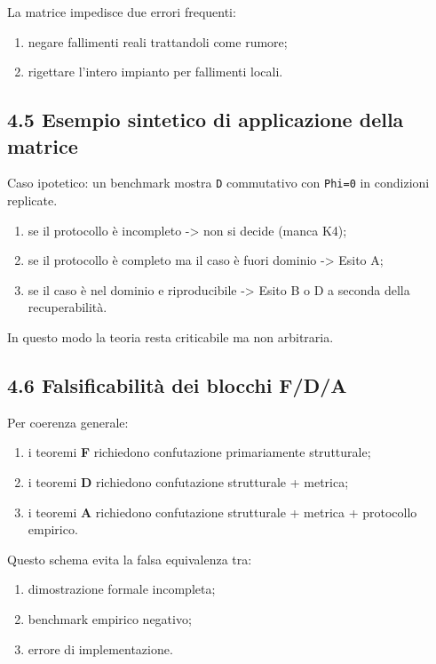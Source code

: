 La matrice impedisce due errori frequenti:

\begin{enumerate}
\def\labelenumi{\arabic{enumi}.}
\tightlist
\item
  negare fallimenti reali trattandoli come rumore;
\item
  rigettare l'intero impianto per fallimenti locali.
\end{enumerate}

\subsection{4.5 Esempio sintetico di applicazione della matrice}

Caso ipotetico: un benchmark mostra \texttt{D} commutativo con \texttt{Phi=0} in condizioni replicate.

\begin{enumerate}
\def\labelenumi{\arabic{enumi}.}
\tightlist
\item
  se il protocollo è incompleto -\textgreater{} non si decide (manca K4);
\item
  se il protocollo è completo ma il caso è fuori dominio -\textgreater{} Esito A;
\item
  se il caso è nel dominio e riproducibile -\textgreater{} Esito B o D a seconda della recuperabilità.
\end{enumerate}

In questo modo la teoria resta criticabile ma non arbitraria.

\subsection{4.6 Falsificabilità dei blocchi F/D/A}

Per coerenza generale:

\begin{enumerate}
\def\labelenumi{\arabic{enumi}.}
\tightlist
\item
  i teoremi \textbf{F} richiedono confutazione primariamente strutturale;
\item
  i teoremi \textbf{D} richiedono confutazione strutturale + metrica;
\item
  i teoremi \textbf{A} richiedono confutazione strutturale + metrica + protocollo empirico.
\end{enumerate}

Questo schema evita la falsa equivalenza tra:

\begin{enumerate}
\def\labelenumi{\arabic{enumi}.}
\tightlist
\item
  dimostrazione formale incompleta;
\item
  benchmark empirico negativo;
\item
  errore di implementazione.
\end{enumerate}


